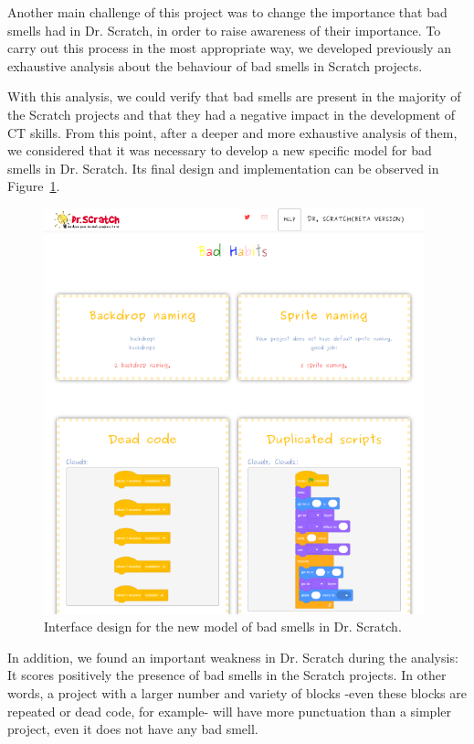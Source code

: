 Another main challenge of this project was to change the importance that bad smells had in Dr. Scratch, in order to raise awareness of their importance. To carry out this process in the most appropriate way, we developed previously an exhaustive analysis about the behaviour of bad smells in Scratch projects.

With this analysis, we could verify that bad smells are present in the majority of the Scratch projects and that they had a negative impact in the development of CT skills. From this point, after a deeper and more exhaustive analysis of them, we considered that it was necessary to develop a new specific model for bad smells in Dr. Scratch. Its final design and implementation can be observed in Figure~\ref{fig:bad_smells_model}.

\begin{figure}
  \centering
  \includegraphics[width=11cm, keepaspectratio]{img/new_model.png}
  \caption{Interface design for the new model of bad smells in Dr. Scratch.}
  \label{fig:bad_smells_model}
\end{figure}

In addition, we found an important weakness in Dr. Scratch during the analysis: It scores positively the presence of bad smells in the Scratch projects. In other words, a project with a larger number and variety of blocks -even these blocks are repeated or dead code, for example- will have more punctuation than a simpler project, even it does not have any bad smell. 

